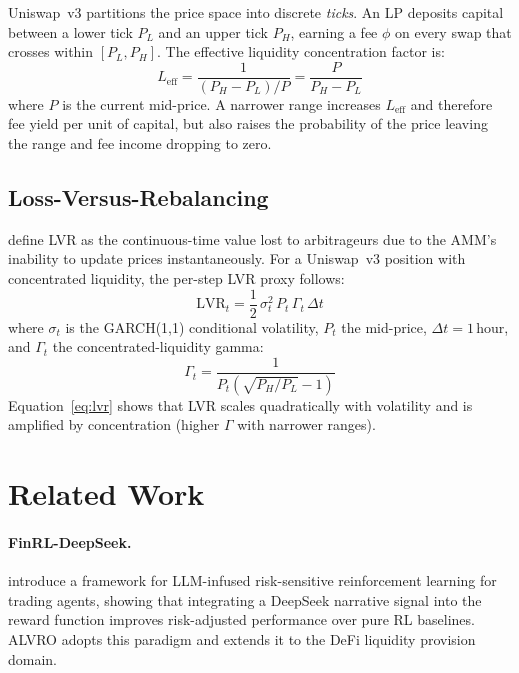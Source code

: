 \documentclass{article}
\begin{document}
Uniswap~v3 partitions the price space into discrete \emph{ticks}.  An LP
deposits capital between a lower tick $P_L$ and an upper tick $P_H$, earning
a fee $\phi$ on every swap that crosses within $[P_L, P_H]$.  The effective
liquidity concentration factor is:
\begin{equation}
  L_{\text{eff}} = \frac{1}{(P_H - P_L)/P} = \frac{P}{P_H - P_L}
  \label{eq:leff}
\end{equation}
where $P$ is the current mid-price.  A narrower range increases $L_{\text{eff}}$
and therefore fee yield per unit of capital, but also raises the probability
of the price leaving the range and fee income dropping to zero.

\subsection{Loss-Versus-Rebalancing}

\citet{milionis2022} define LVR as the continuous-time value lost to
arbitrageurs due to the AMM's inability to update prices instantaneously.
For a Uniswap~v3 position with concentrated liquidity, the per-step LVR
proxy follows:
\begin{equation}
  \text{LVR}_t = \frac{1}{2}\,\sigma_t^2\,P_t\,\Gamma_t\,\Delta t
  \label{eq:lvr}
\end{equation}
where $\sigma_t$ is the GARCH(1,1) conditional volatility, $P_t$ the
mid-price, $\Delta t = 1\,\text{hour}$, and $\Gamma_t$ the concentrated-liquidity
gamma:
\begin{equation}
  \Gamma_t = \frac{1}{P_t\!\left(\sqrt{P_H/P_L} - 1\right)}
  \label{eq:gamma}
\end{equation}
Equation~\eqref{eq:lvr} shows that LVR scales quadratically with volatility
and is amplified by concentration (higher $\Gamma$ with narrower ranges).

\section{Related Work}

\paragraph{FinRL-DeepSeek.}
\citet{benhenda2025} introduce a framework for LLM-infused risk-sensitive
reinforcement learning for trading agents, showing that integrating a DeepSeek
narrative signal into the reward function improves risk-adjusted performance
over pure RL baselines.  ALVRO adopts this paradigm and extends it to the
DeFi liquidity provision domain.
\end{document}
